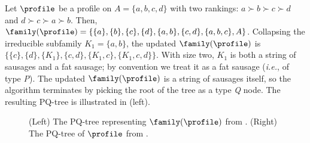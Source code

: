 \begin{example}\label{ex:pq-tree}
    Let $\profile$ be a profile on $A=\{a, b, c, d\}$ with two rankings: $a\succ b \succ c \succ d$ and $d \succ c \succ a \succ b$.
    Then, $\family(\profile) = \{\{a\}, \{b\}, \{c\}, \{d\}, \{a,b\}, \{c, d\}, \{a, b, c\}, A\}$.
    Collapsing the irreducible subfamily $K_1 = \{a, b\}$, the updated $\family(\profile)$  is $\{\{c\}, \{d\}, \{K_1\}, \{c, d\}, \{K_1, c\}, \{K_1, c, d\}\}$.
    With size two, $K_1$ is both a string of sausages and a fat sausage; by convention we treat it as a fat sausage (\emph{i.e.}, of type \emph{P}).
    The updated $\family(\profile)$ is a string of sausages itself, so the algorithm terminates by picking the root of the tree as a type \emph{Q} node. The resulting PQ-tree is illustrated in  (left).
    
    \begin{figure}[t]
        \centering
         \quad \quad \quad \quad
        \caption{(Left) The PQ-tree representing $\family(\profile)$ from   . (Right) The PQ-tree of $\profile$ from .}\label{fig:tree}
    \end{figure}
\end{example}

